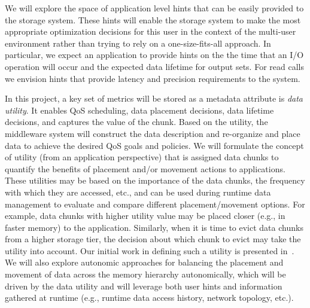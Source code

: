 We will explore the space of application level hints that can be easily provided
to the storage system. These hints will enable the storage system to make the
most appropriate optimization decisions for this user in the context of the
multi-user environment rather than trying to rely on a one-size-fits-all
approach. In particular, we expect an application to provide hints on the
the time that an I/O operation will occur and
the expected data lifetime for output sets. For read calls we envision
hints that provide latency and precision requirements to the system. 

In this project, a key set of metrics will be stored as a metadata
attribute is \textit{data utility}.  It enables QoS scheduling, data placement
decisions, data lifetime decisions, and captures the value of the chunk.
Based on the utility, the middleware
system will construct the data description and re-organize and place data to
achieve the desired QoS goals and policies.
 We will formulate the concept of utility (from an
application perspective) that is assigned data chunks to quantify the
benefits of placement and/or movement actions to applications. These
utilities may be based on the importance of the data chunks, the frequency
with which they are accessed, etc., and can be used during runtime data
management to evaluate and compare different placement/movement options. 
For example, data chunks with higher utility value may be
placed closer (e.g., in faster memory) to the application.
Similarly, when it is time to evict data chunks from a higher storage
tier, the decision about which chunk to evict may take the utility into
account. Our initial work in defining such a utility is presented in~\cite{tongipdps15}.
 We will also explore autonomic approaches for balancing the placement and 
 movement of data across the memory hierarchy autonomically, which will be driven 
 by the data utility and will leverage both user hints and information gathered at runtime (e.g., runtime data access
history, network topology, etc.).

